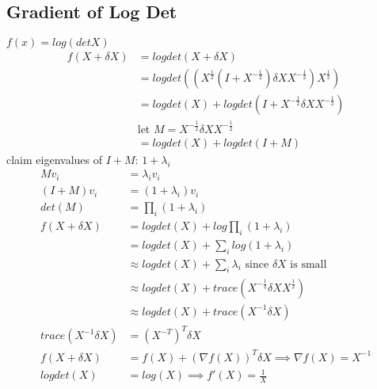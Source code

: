 \documentclass[8pt]{report}
\begin{document}
\begin{multicols*}{2}
  \subsection{Gradient of Log Det}
  $f(x)=log(det X)$\\
  \begin{align*}
    f(X+\delta X) &= logdet(X+\delta X)\\
                  &= logdet((X^{\frac{1}{2}}(I+X^{-\frac{1}{2}}) \delta X X^{-\frac{1}{2}})X^{\frac{1}{2}})\\
                  &= logdet(X)+logdet(I+X^{-\frac{1}{2}} \delta X X^{-\frac{1}{2}})\\
                  & \text{let } M = X^{-\frac{1}{2}} \delta X X^{-\frac{1}{2}}\\
                  &= logdet(X)+logdet(I+M)
  \end{align*}
  claim eigenvalues of $I+M$: $1+\lambda_i$
  \begin{align*}
    Mv_i &= \lambda_i v_i\\
    (I+M)v_i &= (1+\lambda_i)v_i\\
    det(M)&=\prod_i(1+\lambda_i)\\
    f(X+\delta X) &= logdet(X) + log \prod_i(1+\lambda_i)\\
         &= logdet(X) + \sum_i log(1+\lambda_i)\\
         &\approx logdet(X) + \sum_i \lambda_i \text{ since } \delta X \text{ is small}\\
         &\approx logdet(X) + trace(X^{-\frac{1}{2}} \delta X X^{\frac{1}{2}})\\
         &\approx logdet(X) + trace(X^{-1} \delta X)\\
    trace(X^{-1} \delta X) &= (X^{-T})^T \delta X\\
    f(X+\delta X) &= f(X) + (\nabla f(X))^T \delta X \implies \nabla f(X) = X^{-1}\\
    logdet(X) &= log(X) \implies f'(X)=\frac{1}{X}
  \end{align*}
    

\end{multicols*}
\end{document}
